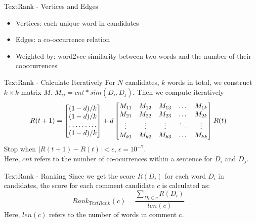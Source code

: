 \documentclass[aspectratio=169]{beamer}
\begin{document}
    \begin{frame}{TextRank - Vertices and Edges}
      \begin{itemize}
        \item Vertices: each unique word in candidates
        \item Edges: a co-occurrence relation
        \item Weighted by: word2vec similarity between two words and the number of their cooccurrences
      \end{itemize}
    \end{frame}

    \begin{frame}{TextRank - Calculate Iteratively}
      For $N$ candidates, $k$ words in total, we construct $ k \times k $ 
      matrix $M$. $M_{ij} = cnt * sim(D_i, D_j)$. Then we compute iteratively
      \[
      R(t+1) = 
      \begin{bmatrix}
          (1-d)/k       \\
          (1-d)/k       \\
          \hdotsfor{1} \\
          (1-d)/k       
      \end{bmatrix}
      +d
      \begin{bmatrix}
          M_{11} & M_{12} & M_{13} & \dots  & M_{1k} \\
          M_{21} & M_{22} & M_{23} & \dots  & M_{2k} \\
          \vdots & \vdots & \vdots & \ddots & \vdots \\
          M_{k1} & M_{k2} & M_{k3} & \dots  & M_{kk}
      \end{bmatrix}
      R(t)
      \]
      Stop when $|R(t+1)-R(t)|<\epsilon$, $\epsilon = 10^{-7}$. \\
      Here, $cnt$ refers to the number of co-ocurrences within a sentence for $D_i$ and $D_j$. \\
    \end{frame}

    \begin{frame}{TextRank - Ranking}
      Since we get the score $R(D_i)$ for each word $D_i$ in candidates, the 
      score for each comment candidate $c$ is calculated as:
      \begin{equation}
        Rank_{TextRank}(c) = \frac{\sum_{D_i \in c}{R(D_i)}}{len(c)} 
      \end{equation}
      Here, $len(c)$ refers to the number of words in comment c.
    \end{frame}
\end{document}
